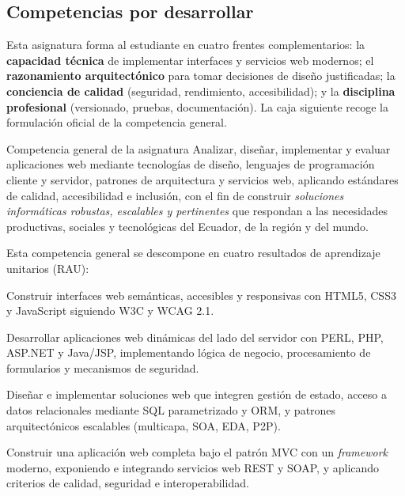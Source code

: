 \documentclass[11pt,a4paper,openany]{book}
\begin{document}
\subsection{Competencias por desarrollar}

Esta asignatura forma al estudiante en cuatro frentes complementarios:
la \textbf{capacidad técnica} de implementar interfaces y servicios
web modernos; el \textbf{razonamiento arquitectónico} para tomar
decisiones de diseño justificadas; la \textbf{conciencia de calidad}
(seguridad, rendimiento, accesibilidad); y la \textbf{disciplina
profesional} (versionado, pruebas, documentación). La caja siguiente
recoge la formulación oficial de la competencia general.


\begin{cajadefinicion}{Competencia general de la asignatura}
Analizar, diseñar, implementar y evaluar aplicaciones web mediante
tecnologías de diseño, lenguajes de programación cliente y servidor,
patrones de arquitectura y servicios web, aplicando estándares de
calidad, accesibilidad e inclusión, con el fin de construir
\emph{soluciones informáticas robustas, escalables y pertinentes} que
respondan a las necesidades productivas, sociales y tecnológicas del
Ecuador, de la región y del mundo.
\end{cajadefinicion}

Esta competencia general se descompone en cuatro resultados de
aprendizaje unitarios (RAU):

\begin{description}[leftmargin=1.5cm]
\item[RAU 1.] Construir interfaces web semánticas, accesibles y
responsivas con HTML5, CSS3 y JavaScript siguiendo W3C y WCAG 2.1.
\item[RAU 2.] Desarrollar aplicaciones web dinámicas del lado del
servidor con PERL, PHP, ASP.NET y Java/JSP, implementando lógica de
negocio, procesamiento de formularios y mecanismos de seguridad.
\item[RAU 3.] Diseñar e implementar soluciones web que integren gestión
de estado, acceso a datos relacionales mediante SQL parametrizado y
ORM, y patrones arquitectónicos escalables (multicapa, SOA, EDA, P2P).
\item[RAU 4.] Construir una aplicación web completa bajo el patrón MVC
con un \emph{framework} moderno, exponiendo e integrando servicios web
REST y SOAP, y aplicando criterios de calidad, seguridad e
interoperabilidad.
\end{description}
\end{document}
